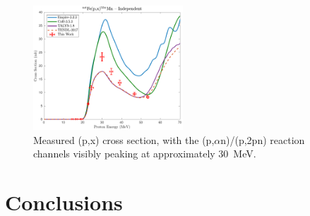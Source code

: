 \begin{figure}[h]
 \centering
 \includegraphics[width=0.5\textwidth]{./figures/52mMn.pdf}
 \caption{Measured (p,x) cross section, with the (p,$\alpha$n)/(p,2pn) reaction channels visibly peaking at approximately \mbox{30 MeV}.}
 \label{fig:temp_52mMn}
\end{figure}



% 
% 
% 





 
 \section{\label{sec:conclusions_fe}Conclusions}
 

